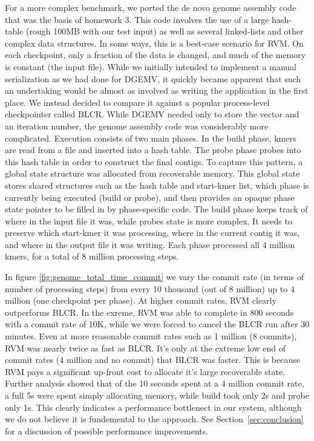 For a more complex benchmark, we ported the de novo genome assembly code that
was the basis of homework 3. This code involves the use of a large hash-table
(rough 100MB with our test input) as well as several linked-lists and other
complex data structures. In some ways, this is a best-case scenario for RVM. On
each checkpoint, only a fraction of the data is changed, and much of the memory
is constant (the input file). While we initially intended to implement a manual
serialization as we had done for DGEMV, it quickly became apparent that such an
undertaking would be almost as involved as writing the application in the first
place. We instead decided to compare it against a popular process-level
checkpointer called BLCR\cite{BLCR}. While DGEMV needed only to store the vector
and an iteration number, the genome assembly code was considerably more
complicated. Execution consists of two main phases. In the build phase, kmers
are read from a file and inserted into a hash table. The probe phase probes into
this hash table in order to construct the final contigs. To capture this
pattern, a global state structure was allocated from recoverable memory. This
global state stores shared structures such as the hash table and start-kmer
list, which phase is currently being executed (build or probe), and then
provides an opaque phase state pointer to be filled in by phase-specific code.
 The build phase keeps track of where in the input file it was, while probes
state is more complex. It needs to preserve which start-kmer it was
processing, where in the current contig it was, and where in the output file it
was writing. Each phase processed all 4 million kmers, for a total of 8 million
processing steps.

In figure \ref{fig:genome_total_time_commit} we vary the commit rate (in terms
of number of processing steps) from every 10 thousand (out of 8 million) up to
4 million (one checkpoint per phase). At higher commit rates, RVM clearly
outperforms BLCR. In the exreme, RVM was able to complete in 800 seconds with a
commit rate of 10K, while we were forced to cancel the BLCR run after 30
minutes. Even at more reasonable commit rates such as 1 million (8 commits),
RVM was nearly twice as fast as BLCR. It's only at the extreme low end of
commit rates (4 million and no commit) that BLCR was faster. This is because
RVM pays a significant up-front cost to allocate it's large recoverable state.
Further analysis showed that of the 10 seconds spent at a 4 million commit
rate, a full 5s were spent simply allocating memory, while build took only 2s
and probe only 1s. This clearly indicates a performance bottlenect in our
system, although we do not believe it is fundemental to the approach. See
Section~\ref{sec:conclusion} for a discussion of possible performance
improvements. 

